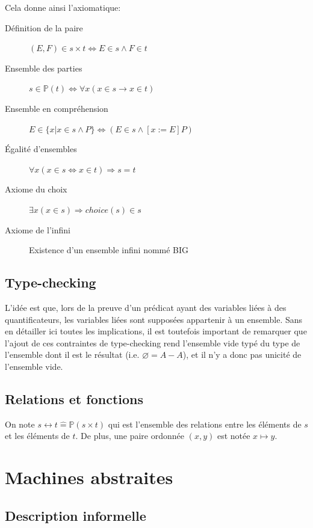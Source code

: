\documentclass[10pt,a4paper]{article}
\newcommand{\Bequal}{\mathrel{\widehat{=}}}
\begin{document}
Cela donne ainsi l'axiomatique:
\begin{description}
\item[Définition de la paire] $(E, F) \in s \times t \Leftrightarrow E \in s \wedge F \in t$
\item[Ensemble des parties] $s \in \mathbb{P}(t) \Leftrightarrow \forall x (x \in s \rightarrow x \in t)$
\item[Ensemble en compréhension] $E \in \{ x | x \in s \wedge P \} \Leftrightarrow (E \in s \wedge [x:= E] P)$
\item[Égalité d'ensembles] $\forall x (x \in s \Leftrightarrow x \in t) \Rightarrow s = t$
\item[Axiome du choix] $\exists x  (x \in s) \Rightarrow choice(s) \in s$
\item[Axiome de l'infini] Existence d'un ensemble infini nommé BIG
\end{description}

\subsection{Type-checking}

L'idée est que, lors de la preuve d'un prédicat ayant des variables liées à des quantificateurs, les variables liées sont supposées appartenir à un ensemble.
Sans en détailler ici toutes les implications, il est toutefois important de remarquer que l'ajout de ces contraintes de type-checking rend l'ensemble vide typé du type de l'ensemble dont il est le résultat (i.e. $\varnothing = A - A$), et il n'y a donc pas unicité de l'ensemble vide. 

\subsection{Relations et fonctions}

On note  $ s \leftrightarrow t \Bequal \mathbb{P}(s \times t)$ qui est l'ensemble des relations entre les éléments de $s$ et les éléments de $t$. De plus, une paire ordonnée $(x, y)$ est notée $x \mapsto y$.

\section{Machines abstraites}

\subsection{Description informelle}
\end{document}
